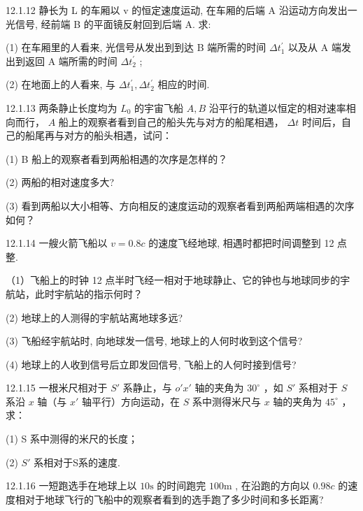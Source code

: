 \begin{problem}{12.1.12}
静长为 L 的车厢以 v 的恒定速度运动, 在车厢的后端 A 沿运动方向发出一光信号, 经前端 B 的平面镜反射回到后端 A. 求:

(1) 在车厢里的人看来, 光信号从发出到到达 B 端所需的时间 $\Delta t_{1}^{\prime}$ 以及从 A 端发出到返回 A 端所需的时间 $\Delta t_{2}^{\prime}$ ;

(2) 在地面上的人看来, 与 $\Delta t_{1}^{\prime}, \Delta t_{2}^{\prime}$ 相应的时间.
\end{problem}
\clearpage


\begin{problem}{12.1.13}
两条静止长度均为 $L_{0}$ 的宇宙飞船 $A, B$ 沿平行的轨道以恒定的相对速率相向而行， $A$ 船上的观察者看到自己的船头先与对方的船尾相遇， $\Delta t$ 时间后，自己的船尾再与对方的船头相遇，试问：

(1) B 船上的观察者看到两船相遇的次序是怎样的？

(2) 两船的相对速度多大?

(3) 看到两船以大小相等、方向相反的速度运动的观察者看到两船两端相遇的次序如何？
\end{problem}
\clearpage


\begin{problem}{12.1.14}
一艘火箭飞船以 $v = 0.8c$ 的速度飞经地球, 相遇时都把时间调整到 12 点整.

（1）飞船上的时钟 12 点半时飞经一相对于地球静止、它的钟也与地球同步的宇航站，此时宇航站的指示何时？

(2) 地球上的人测得的宇航站离地球多远?

(3) 飞船经宇航站时, 向地球发一信号, 地球上的人何时收到这个信号?

(4) 地球上的人收到信号后立即发回信号, 飞船上的人何时接到信号?
\end{problem}
\clearpage


\begin{problem}{12.1.15}
一根米尺相对于 $S'$ 系静止，与 $o'x'$ 轴的夹角为 $30^\circ$ ，如 $S'$ 系相对于 $S$ 系沿 $x$ 轴（与 $x'$ 轴平行）方向运动，在 $S$ 系中测得米尺与 $x$ 轴的夹角为 $45^\circ$ ，求：

(1) S 系中测得的米尺的长度；

(2) $S'$ 系相对于S系的速度.
\end{problem}
\clearpage


\begin{problem}{12.1.16}
一短跑选手在地球上以 $10\mathrm{s}$ 的时间跑完 $100\mathrm{m}$ , 在沿跑的方向以 $0.98c$ 的速度相对于地球飞行的飞船中的观察者看到的选手跑了多少时间和多长距离?
\end{problem}
\clearpage



